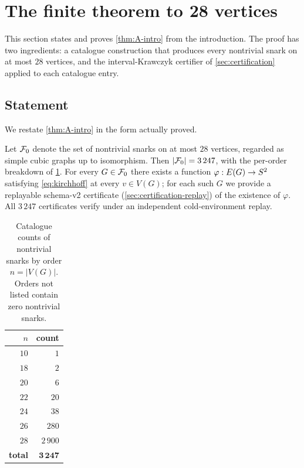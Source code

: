 \section{The finite theorem to 28 vertices}
\label{sec:finite-theorem}

This section states and proves \cref{thm:A-intro} from the
introduction. The proof has two ingredients: a catalogue construction
that produces every nontrivial snark on at most $28$ vertices, and the
interval-Krawczyk certifier of \cref{sec:certification} applied to
each catalogue entry.

\subsection{Statement}
\label{sec:finite-theorem-statement}

We restate \cref{thm:A-intro} in the form actually proved.

\begin{theorem}
\label{thm:A}
Let $\mathcal{F}_0$ denote the set of nontrivial snarks on at most $28$
vertices, regarded as simple cubic graphs up to isomorphism. Then
$|\mathcal{F}_0| = 3\,247$, with the per-order breakdown of
\cref{tab:catalogue-counts}. For every $G \in \mathcal{F}_0$ there exists a
function $\varphi : E(G) \to S^{2}$ satisfying \cref{eq:kirchhoff}
at every $v \in V(G)$; for each such $G$ we provide a replayable
schema-v2 certificate (\cref{sec:certification-replay}) of the
existence of $\varphi$. All $3\,247$ certificates verify under an
independent cold-environment replay.
\end{theorem}

\begin{table}[t]
\centering
\caption{Catalogue counts of nontrivial snarks by order $n = |V(G)|$.
Orders not listed contain zero nontrivial snarks.}
\label{tab:catalogue-counts}
\begin{tabular}{r r}
\toprule
$n$ & count \\
\midrule
$10$ & $1$ \\
$18$ & $2$ \\
$20$ & $6$ \\
$22$ & $20$ \\
$24$ & $38$ \\
$26$ & $280$ \\
$28$ & $2\,900$ \\
\midrule
\textbf{total} & $\mathbf{3\,247}$ \\
\bottomrule
\end{tabular}
\end{table}

